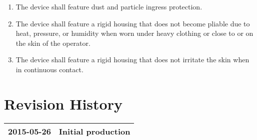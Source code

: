 \documentclass[twoside]{article}
\begin{document}
\begin{enumerate}
\begin{enumerate}
  \item The device shall feature dust and particle ingress protection.

  \item The device shall feature a rigid housing that does not become pliable due to heat, pressure, or humidity when worn under heavy clothing or close to or on the skin of the operator.

  \item The device shall feature a rigid housing that does not irritate the skin when in continuous contact.

  \end{enumerate}

\end{enumerate}



\section{Revision History}

\center
\begin{tabular}{|c|p{10cm}|}
  \hline
  2015-05-26 & Initial production \\\hline

\end{tabular}


%

\end{document}
